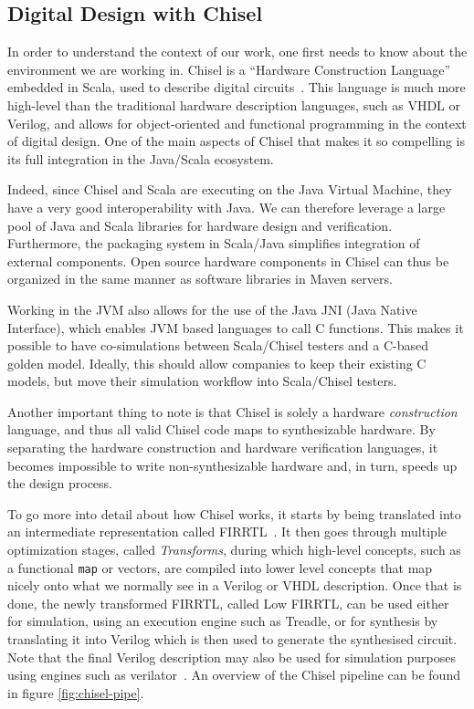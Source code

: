 \documentclass[conference]{IEEEtran}
\begin{document}
\subsection{Digital Design with Chisel}
In order to understand the context of our work, one first needs to know about the environment we are working in.
Chisel is a ``Hardware Construction Language'' embedded in Scala, used to describe digital circuits~\cite{chisel:dac2012}.
This language is much more high-level than the traditional hardware description languages, such as VHDL or Verilog, and allows for object-oriented and functional programming in the context of digital design.
One of the main aspects of Chisel that makes it so compelling is its full integration in the Java/Scala ecosystem.

Indeed, since Chisel and Scala are executing on the Java Virtual Machine, they have a very good interoperability with Java. 
We can therefore leverage a large pool of Java and Scala libraries for hardware design and verification. 
Furthermore, the packaging system in Scala/Java simplifies integration of external components.
Open source hardware components in Chisel can thus be organized in the same manner as software libraries in Maven servers.

Working in the JVM also allows for the use of the Java JNI (Java Native Interface), which enables JVM based languages to call C functions.
This makes it possible to have co-simulations between Scala/Chisel testers and a C-based golden model. 
Ideally, this should allow companies to keep their existing C models, but move their simulation workflow into Scala/Chisel testers.

Another important thing to note is that Chisel is solely a hardware \emph{construction} language, and thus all valid Chisel code maps to synthesizable hardware.
By separating the hardware construction and hardware verification languages, it becomes impossible to write non-synthesizable hardware and, in turn, speeds up the design process.

To go more into detail about how Chisel works, it starts by being translated into an intermediate representation called FIRRTL~\cite{firrtl}. It then goes through multiple optimization stages, called \textit{Transforms}, during which high-level concepts, such as a functional \texttt{map} or vectors, are compiled into lower level concepts that map nicely onto what we normally see in a Verilog or VHDL description. Once that is done, the newly transformed FIRRTL, called Low FIRRTL, can be used either for simulation, using an execution engine such as Treadle, or for synthesis by translating it into Verilog which is then used to generate the synthesised circuit. Note that the final Verilog description may also be used for simulation purposes using engines such as verilator~\cite{verilator}. An overview of the Chisel pipeline can be found in figure \ref{fig:chisel-pipe}.
\end{document}
